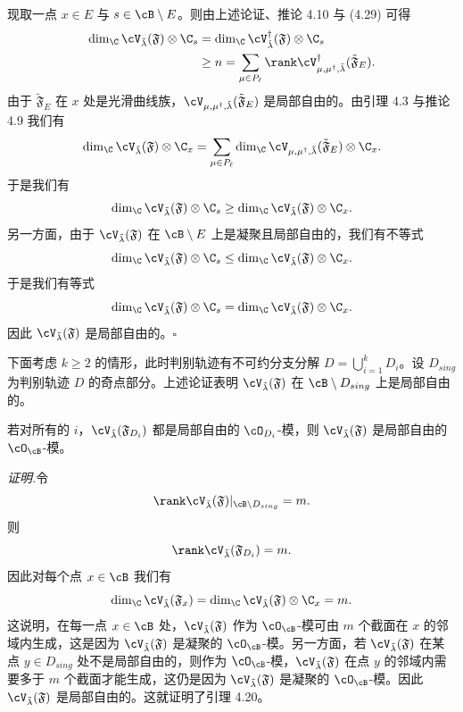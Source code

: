 现取一点 $x\in E$ 与 $s\in\cB\setminus E$。则由上述论证、推论 4.10 与 (4.29) 可得
\begin{align*}
 \dim_\C\cV_{\tilde\lambda}(\mathfrak F)\otimes\C_s
 &=\dim_\C\cV^\dagger_{\tilde\lambda}(\mathfrak F)\otimes\C_s\\
 &\ge n=\sum_{\mu\in P_\ell}\rank\cV^\dagger_{\mu,\mu^\dagger,\tilde\lambda}(\tilde{\mathfrak F}_E).
\end{align*}
由于 $\tilde{\mathfrak F}_E$ 在 $x$ 处是光滑曲线族，$\cV_{\mu,\mu^\dagger,\tilde\lambda}(\tilde{\mathfrak F}_E)$ 是局部自由的。由引理 4.3 与推论 4.9 我们有
\[
 \dim_\C\cV_{\tilde\lambda}(\mathfrak F)\otimes\C_x
 =\sum_{\mu\in P_\ell}\dim_\C\cV_{\mu,\mu^\dagger,\tilde\lambda}(\tilde{\mathfrak F}_E)\otimes\C_x.
\]
于是我们有
\[
 \dim_\C\cV_{\tilde\lambda}(\mathfrak F)\otimes\C_s
 \ge\dim_\C\cV_{\tilde\lambda}(\mathfrak F)\otimes\C_x.
\]
另一方面，由于 $\cV_{\tilde\lambda}(\mathfrak F)$ 在 $\cB\setminus E$ 上是凝聚且局部自由的，我们有不等式
\[
 \dim_\C\cV_{\tilde\lambda}(\mathfrak F)\otimes\C_s
 \le\dim_\C\cV_{\tilde\lambda}(\mathfrak F)\otimes\C_x.
\]
于是我们有等式
\[
 \dim_\C\cV_{\tilde\lambda}(\mathfrak F)\otimes\C_s
 =\dim_\C\cV_{\tilde\lambda}(\mathfrak F)\otimes\C_x.
\]
因此 $\cV_{\tilde\lambda}(\mathfrak F)$ 是局部自由的。\hfill$\square$


下面考虑 $k\ge2$ 的情形，此时判别轨迹有不可约分支分解 $D=\bigcup_{i=1}^{k}D_i$。设 $D_{sing}$ 为判别轨迹 $D$ 的奇点部分。上述论证表明 $\cV_{\tilde\lambda}(\mathfrak F)$ 在 $\cB\setminus D_{sing}$ 上是局部自由的。

\begin{lemma}[4.20]
 若对所有的 $i$，$\cV_{\tilde\lambda}(\mathfrak F_{D_i})$ 都是局部自由的 $\cO_{D_i}$-模，则 $\cV_{\tilde\lambda}(\mathfrak F)$ 是局部自由的 $\cO_\cB$-模。
\end{lemma}

\noindent\textit{证明.}\quad 令
\[
 \rank\cV_{\tilde\lambda}(\mathfrak F)|_{\cB\setminus D_{sing}}=m.
\]
则
\[
 \rank\cV_{\tilde\lambda}(\mathfrak F_{D_i})=m.
\]
因此对每个点 $x\in\cB$ 我们有
\[
 \dim_\C\cV_{\tilde\lambda}(\mathfrak F_x)=\dim_\C\cV_{\tilde\lambda}(\mathfrak F)\otimes\C_x=m.
\]
这说明，在每一点 $x\in\cB$ 处，$\cV_{\tilde\lambda}(\mathfrak F)$ 作为 $\cO_\cB$-模可由 $m$ 个截面在 $x$ 的邻域内生成，这是因为 $\cV_{\tilde\lambda}(\mathfrak F)$ 是凝聚的 $\cO_\cB$-模。另一方面，若 $\cV_{\tilde\lambda}(\mathfrak F)$ 在某点 $y\in D_{sing}$ 处不是局部自由的，则作为 $\cO_\cB$-模，$\cV_{\tilde\lambda}(\mathfrak F)$ 在点 $y$ 的邻域内需要多于 $m$ 个截面才能生成，这仍是因为 $\cV_{\tilde\lambda}(\mathfrak F)$ 是凝聚的 $\cO_\cB$-模。因此 $\cV_{\tilde\lambda}(\mathfrak F)$ 是局部自由的。这就证明了引理 4.20。

